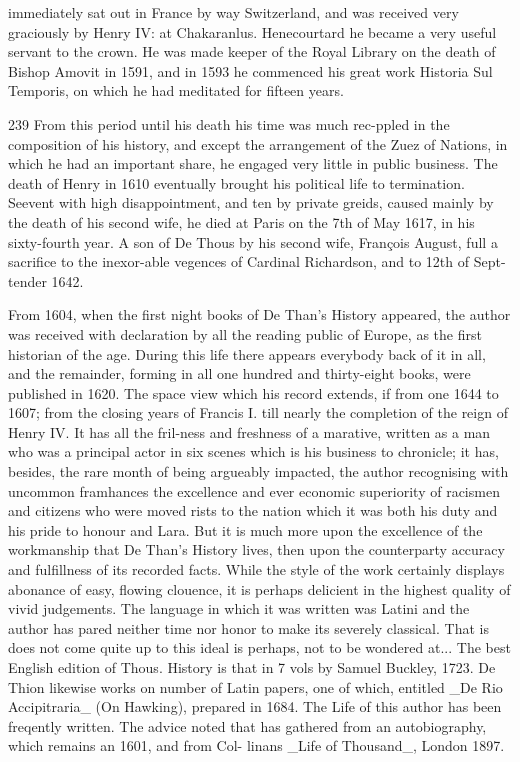 \documentclass{article}
\begin{document}
immediately sat out in France by way Switzerland, and was received very graciously by Henry IV: at Chakaranlus. Henecourtard he became a very useful servant to the crown. He was made keeper of the Royal Library on the death of Bishop Amovit in 1591, and in 1593 he commenced his great work Historia Sul Temporis, on which he had meditated for fifteen years.

239 From this period until his death his time was much rec-ppled in the composition of his history, and except the arrangement of the Zuez of Nations, in which he had an important share, he engaged very little in public business. The death of Henry in 1610 eventually brought his political life to termination. Seevent with high disappointment, and ten by private greids, caused mainly by the death of his second wife, he died at Paris on the 7th of May 1617, in his sixty-fourth year. A son of De Thous by his second wife, François August, full a sacrifice to the inexor-able vegences of Cardinal Richardson, and to 12th of Sept- tender 1642.

From 1604, when the first night books of De Than’s History appeared, the author was received with declaration by all the reading public of Europe, as the first historian of the age. During this life there appears everybody back of it in all, and the remainder, forming in all one hundred and thirty-eight books, were published in 1620. The space view which his record extends, if from one 1644 to 1607; from the closing years of Francis I. till nearly the completion of the reign of Henry IV. It has all the fril-ness and freshness of a marative, written as a man who was a principal actor in six scenes which is his business to chronicle; it has, besides, the rare month of being argueably impacted, the author recognising with uncommon framhances the excellence and ever economic superiority of racismen and citizens who were moved rists to the nation which it was both his duty and his pride to honour and Lara. But it is much more upon the excellence of the workmanship that De Than’s History lives, then upon the counterparty accuracy and fulfillness of its recorded facts. While the style of the work certainly displays abonance of easy, flowing clouence, it is perhaps delicient in the highest quality of vivid judgements. The language in which it was written was Latini and the author has pared neither time nor honor to make its severely classical. That is does not come quite up to this ideal is perhaps, not to be wondered at... The best English edition of Thous. History is that in 7 vols by Samuel Buckley, 1723. De Thion likewise works on number of Latin papers, one of which, entitled \_De Rio Accipitraria\_ (On Hawking), prepared in 1684. The Life of this author has been freqently written. The advice noted that has gathered from an autobiography, which remains an 1601, and from Col- linans \_Life of Thousand\_, London 1897.
\end{document}
